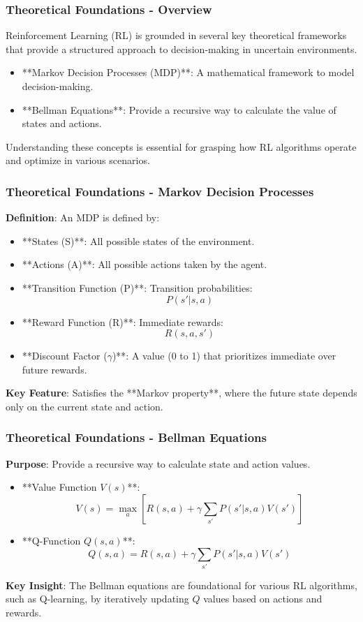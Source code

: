 \documentclass{beamer}
\begin{document}
\begin{frame}[fragile]
    \frametitle{Theoretical Foundations - Overview}
    Reinforcement Learning (RL) is grounded in several key theoretical frameworks that provide a structured approach to decision-making in uncertain environments. 
    \begin{itemize}
        \item **Markov Decision Processes (MDP)**: A mathematical framework to model decision-making.
        \item **Bellman Equations**: Provide a recursive way to calculate the value of states and actions.
    \end{itemize}
    Understanding these concepts is essential for grasping how RL algorithms operate and optimize in various scenarios.
\end{frame}

\begin{frame}[fragile]
    \frametitle{Theoretical Foundations - Markov Decision Processes}
    \textbf{Definition}: An MDP is defined by:
    \begin{itemize}
        \item **States (S)**: All possible states of the environment.
        \item **Actions (A)**: All possible actions taken by the agent.
        \item **Transition Function (P)**: Transition probabilities:
        \[
        P(s' | s, a)
        \]
        \item **Reward Function (R)**: Immediate rewards:
        \[
        R(s, a, s')
        \]
        \item **Discount Factor (\(\gamma\))**: A value (0 to 1) that prioritizes immediate over future rewards.
    \end{itemize}
    \textbf{Key Feature}: Satisfies the **Markov property**, where the future state depends only on the current state and action.
\end{frame}

\begin{frame}[fragile]
    \frametitle{Theoretical Foundations - Bellman Equations}
    \textbf{Purpose}: Provide a recursive way to calculate state and action values.
    \begin{itemize}
        \item **Value Function \(V(s)\)**:
        \[
        V(s) = \max_a \left[ R(s, a) + \gamma \sum_{s'} P(s' | s, a) V(s') \right]
        \]
        \item **Q-Function \(Q(s, a)\)**:
        \[
        Q(s, a) = R(s, a) + \gamma \sum_{s'} P(s' | s, a) V(s')
        \]
    \end{itemize}
    \textbf{Key Insight}: The Bellman equations are foundational for various RL algorithms, such as Q-learning, by iteratively updating \(Q\) values based on actions and rewards.
\end{frame}
\end{document}
